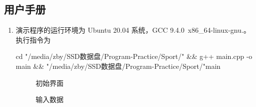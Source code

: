 \documentclass[UTF8,titlepage]{ctexart}
\numberwithin{figure}{section}
\begin{document}
\subsection{用户手册}
\begin{enumerate}
    \item 演示程序的运行环境为 Ubuntu 20.04 系统，GCC 9.4.0\ x86\_64-linux-gnu.。执行指令为
    
    cd "/media/zby/SSD数据盘/Program-Practice/Sport/" \&\& g++ main.cpp -o main \&\& "/media/zby/SSD数据盘/Program-Practice/Sport/"main

    \begin{figure}[H]
    \centering
     \caption{初始界面}
     \label{}
    \end{figure}

    \begin{figure}[H]
    \centering
     \caption{输入数据}
     \label{}
    \end{figure}


\end{enumerate}
\end{document}
